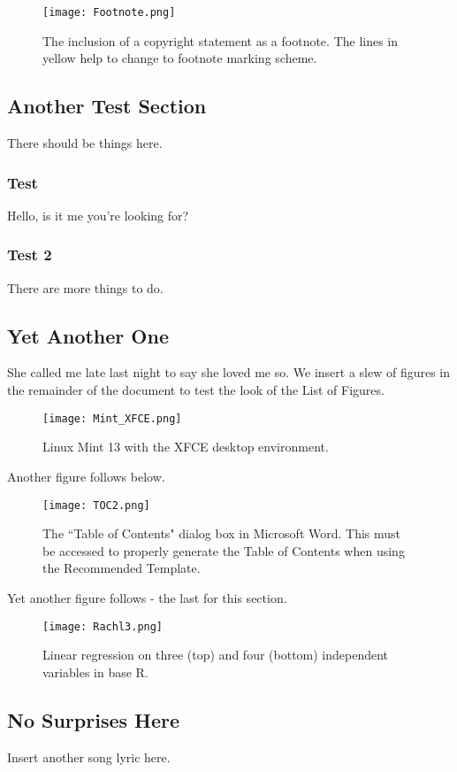 \begin{figure}[ht!]
\centering
	\texttt{[image: Footnote.png]}
	\caption{The inclusion of a copyright statement as a footnote. The lines in yellow help to change to footnote marking scheme.}
\end{figure}

\subsection{Another Test Section}
There should be things here.


\subsubsection{Test}
Hello, is it me you're looking for?

\subsubsection{Test 2}
There are more things to do.

\subsection{Yet Another One}
She called me late last night to say she loved me so. We insert a slew of figures in the remainder of the document to test the look of the List of Figures.

\begin{figure}[H]
	\centering
	\texttt{[image: Mint\_XFCE.png]}
	\caption{Linux Mint 13 with the XFCE desktop environment.}
\end{figure}

Another figure follows below.

\begin{figure}[H]
	\centering
	\texttt{[image: TOC2.png]}
	\singlespace
	\caption{The ``Table of Contents" dialog box in Microsoft Word. This must be accessed to properly generate the Table of Contents when using the Recommended Template.}
\end{figure}

Yet another figure follows - the last for this section.

\begin{figure}[H]
	\centering
	\texttt{[image: Rachl3.png]}
	\singlespace
	\caption{Linear regression on three (top) and four (bottom) independent variables in base R.}
\end{figure}
 
 \subsection{No Surprises Here}
 Insert another song lyric here.

